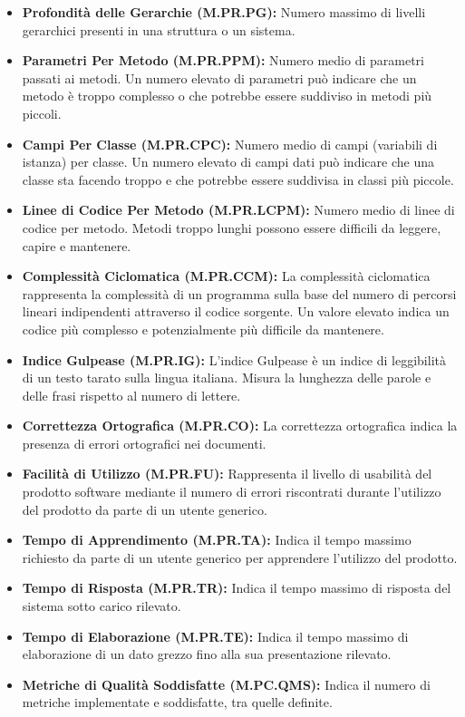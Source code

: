 \begin{itemize}
    \item \textbf{Profondità delle Gerarchie (M.PR.PG):} Numero massimo di livelli gerarchici presenti in una struttura o un sistema.
    \item \textbf{Parametri Per Metodo (M.PR.PPM):} Numero medio di parametri passati ai metodi. Un numero elevato di parametri può indicare che un metodo è troppo complesso o che potrebbe essere suddiviso in metodi più piccoli.
    \item \textbf{Campi Per Classe (M.PR.CPC):} Numero medio di campi (variabili di istanza) per classe. Un numero elevato di campi dati può indicare che una classe sta facendo troppo e che potrebbe essere suddivisa in classi più piccole.
    \item \textbf{Linee di Codice Per Metodo (M.PR.LCPM):} Numero medio di linee di codice per metodo. Metodi troppo lunghi possono essere difficili da leggere, capire e mantenere.
    \item \textbf{Complessità Ciclomatica (M.PR.CCM):} La complessità ciclomatica rappresenta la complessità di un programma sulla base del numero di percorsi lineari indipendenti attraverso il codice sorgente. Un valore elevato indica un codice più complesso e potenzialmente più difficile da mantenere.
    \item \textbf{Indice Gulpease (M.PR.IG):} L'indice Gulpease è un indice di leggibilità di un testo tarato sulla lingua italiana. Misura la lunghezza delle parole e delle frasi rispetto al numero di lettere.
    \item \textbf{Correttezza Ortografica (M.PR.CO):} La correttezza ortografica indica la presenza di errori ortografici nei documenti.
    \item \textbf{Facilità di Utilizzo (M.PR.FU):} Rappresenta il livello di usabilità del prodotto software mediante il numero di errori riscontrati durante l'utilizzo del prodotto da parte di un utente generico.
    \item \textbf{Tempo di Apprendimento (M.PR.TA):} Indica il tempo massimo richiesto da parte di un utente generico per apprendere l’utilizzo del prodotto.
    \item \textbf{Tempo di Risposta (M.PR.TR):} Indica il tempo massimo di risposta del sistema sotto carico rilevato.
    \item \textbf{Tempo di Elaborazione (M.PR.TE):} Indica il tempo massimo di elaborazione di un dato grezzo fino alla sua presentazione rilevato.
    \item \textbf{Metriche di Qualità Soddisfatte (M.PC.QMS):} Indica il numero di metriche implementate e soddisfatte, tra quelle definite.

\end{itemize}
